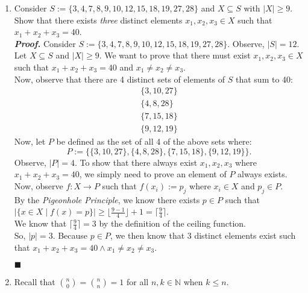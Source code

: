 \documentclass[11pt,a4paper]{article}
\begin{document}
\begin{enumerate}
    \item 
    Consider $S := \{3, 4, 7, 8, 9, 10, 12, 15, 18, 19, 27, 28 \}  $ and $X \subseteq S$ with $|X| \geq 9 $.
    Show that there exists \emph{three} distinct elements $x_1, x_2, x_3 \in X$ such that $x_1 + x_2 + x_3 = 40 $.  \\
    \emph{\textbf{Proof.}} Consider $S := \{3, 4, 7, 8, 9, 10, 12, 15, 18, 19, 27, 28 \}  $. Observe, $|S| =  12$. Let $X \subseteq S  $ and $|X| \geq 9$. 
    We want to prove that there must exist $ x_1, x_2, x_3 \in X $ such that $x_1 + x_2 + x_3 = 40  $ and $x_1 \neq x_2 \neq x_3 $. \\
    Now, observe that there are 4 distinct sets of elements of $S$ that sum to 40: 
    \begin{align*}
        \{3, 10, 27 \} \\
        \{4, 8, 28 \} \\
        \{7, 15, 18 \} \\
        \{9, 12, 19 \}
    \end{align*}
    Now, let $P$ be defined as the set of all 4 of the above sets where:
    \begin{equation}
        P := \{ \{3, 10, 27 \},  \{4, 8, 28 \},  \{7, 15, 18 \}, \{9, 12, 19 \} \}.
    \end{equation}
    Observe, $|P| = 4 $. To show that there always exist $x_1, x_2, x_3  $ where $x_1 + x_2 + x_3 = 40 $,
    we simply need to prove an element of $P$ always exists. \\
    Now, observe $f: X \rightarrow P $ such that $f(x_i) := p_j $ where $x_i \in X $ and $p_j \in P$. \\
    By the \emph{Pigeonhole Principle}, we know there exists $p \in P $ such that $|\{x \in X \mid f(x) = p \} | \geq \lfloor \frac{9 - 1}{4} \rfloor + 1 = \lceil \frac{9}{4} \rceil $. \\
    We know that $\lceil \frac{9}{4} \rceil = 3 $ by the definition of the ceiling function.         \\ 
    So, $|p| = 3 $. Because $p \in P$, we then know that 3 distinct elements exist such that $x_1 + x_2 + x_3 = 40 \land x_1 \neq x_2 \neq x_3 $.
    \begin{flushright}
        $\blacksquare$
    \end{flushright}

    \item 
    Recall that $\binom{n}{0} = \binom{n}{n} = 1 $ for all $n, k \in \mathbb{N} $ when $k \leq n $.
    \begin{enumerate}


\end{enumerate}
\end{enumerate}
\end{document}
